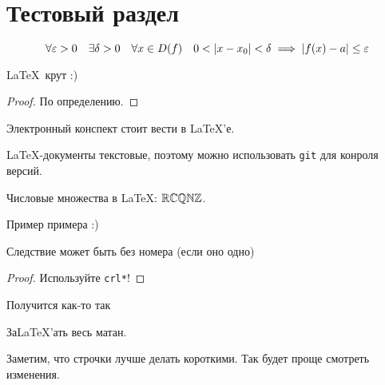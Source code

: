 \documentclass[../../main.tex]{subfiles}
\begin{document}
\section{Тестовый раздел}

\begin{defn}[Коши]
    $$\forall \varepsilon > 0 \quad \exists \delta > 0 \quad \forall x \in D(f) \quad 0 < \left|{x-x_0}\right| < \delta \implies \left|{f(x) - a}\right| \le \varepsilon$$
\end{defn}

\begin{thm}
    \LaTeX\ крут :)
\end{thm}

\begin{proof}
    По определению.
\end{proof}

\begin{crl}
    Электронный конспект стоит вести в \LaTeX'е.
\end{crl}

\begin{crl}
    \LaTeX-документы текстовые,
    поэтому можно использовать \texttt{git} для конроля версий.
\end{crl}

\begin{rem}
    Числовые множества в \LaTeX: $\mathbb{R}\mathbb{C}\mathbb{Q}\mathbb{N}\mathbb{Z}$.
\end{rem}

\begin{exmp}
    Пример примера :)
\end{exmp}


\begin{lem}
 Следствие может быть без номера (если оно одно)
\end{lem}

\begin{proof}
 Используйте \texttt{crl*}!
\end{proof}

\begin{crl*}
    Получится как-то так
\end{crl*}

\begin{exc}
    За\LaTeX'ать весь матан.
\end{exc}

\bigskip

Заметим, что строчки лучше делать короткими.
Так будет проще смотреть изменения.
\end{document}
